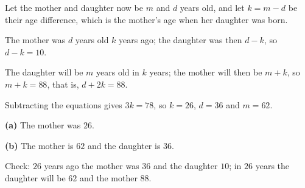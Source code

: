 Let the mother and daughter now be $m$ and $d$ years old, and let $k=m-d$ be their age difference, which is the mother's age when her daughter was born.

The mother was $d$ years old $k$ years ago; the daughter was then $d-k$, so $d-k=10$.

The daughter will be $m$ years old in $k$ years; the mother will then be $m+k$, so $m+k=88$, that is, $d+2k=88$.

Subtracting the equations gives $3k=78$, so $k=26$, $d=36$ and $m=62$.

\textbf{(a)} The mother was $\boxed{26}$.

\textbf{(b)} The mother is $\boxed{62}$ and the daughter is $\boxed{36}$.

Check: $26$ years ago the mother was $36$ and the daughter $10$; in $26$ years the daughter will be $62$ and the mother $88$.
